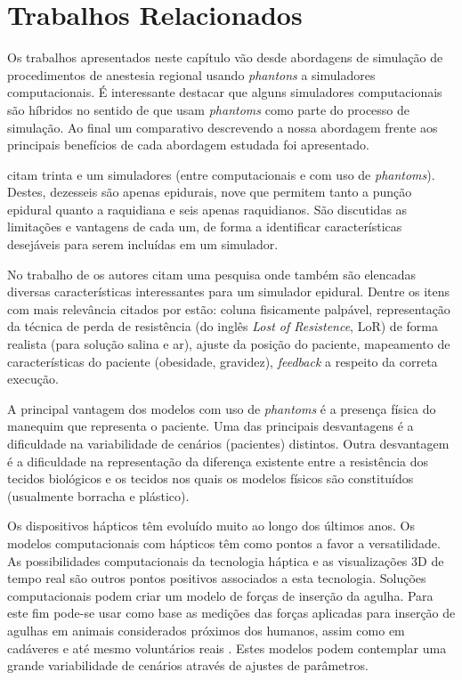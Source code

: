 \chapter{Trabalhos Relacionados} \label{cap:cap3}

Os trabalhos apresentados neste capítulo vão desde abordagens de simulação de procedimentos de anestesia regional usando \textit{phantons} a simuladores computacionais. É interessante destacar que alguns simuladores computacionais são híbridos no sentido de que usam \textit{phantoms} como parte do processo de simulação. Ao final um comparativo descrevendo a nossa abordagem frente aos principais benefícios de cada abordagem estudada foi apresentado.  

\textcite{Vaughan2013} citam trinta e um simuladores (entre computacionais e com uso de \textit{phantoms}). Destes, dezesseis são apenas epidurais, nove que permitem tanto a punção epidural quanto a raquidiana e seis apenas raquidianos. São discutidas as limitações e vantagens de cada um, de forma a identificar características desejáveis para serem incluídas em um simulador. 

No trabalho de \textcite{Isaacs2015} os autores citam uma pesquisa onde também são elencadas diversas características interessantes para um simulador epidural. Dentre os itens com mais relevância citados por \textcite{Isaacs2015} estão: coluna fisicamente palpável, representação da técnica de perda de resistência (do inglês \textit{Lost of Resistence}, \acrshort{LoR}) de forma realista (para solução salina e ar), ajuste da posição do paciente, mapeamento de características do paciente (obesidade, gravidez), \textit{feedback} a respeito da correta execução.

A principal vantagem dos modelos com uso de \textit{phantoms} é a presença física do manequim que representa o paciente. Uma das principais desvantagens é a dificuldade na variabilidade de cenários (pacientes) distintos. Outra desvantagem é a dificuldade na representação da diferença existente entre a resistência dos tecidos biológicos e os tecidos nos quais os modelos físicos são constituídos (usualmente borracha e plástico).

Os dispositivos hápticos têm evoluído muito ao longo dos últimos anos. Os modelos computacionais com hápticos têm como pontos a favor a versatilidade. As possibilidades computacionais da tecnologia háptica e as visualizações 3D de tempo real são outros pontos positivos associados a esta tecnologia. 
Soluções computacionais podem criar um modelo de forças de inserção da agulha. Para este fim pode-se usar como base as medições das forças aplicadas para inserção de agulhas em animais considerados próximos dos humanos, assim como em cadáveres e até mesmo voluntários reais \cite{Hiemenz1998, Holton2001,Langton1990,McKay2010,Naemura2009,Tran2009,Vaughan2012}. Estes modelos podem contemplar uma grande variabilidade de cenários através de ajustes de parâmetros. 

